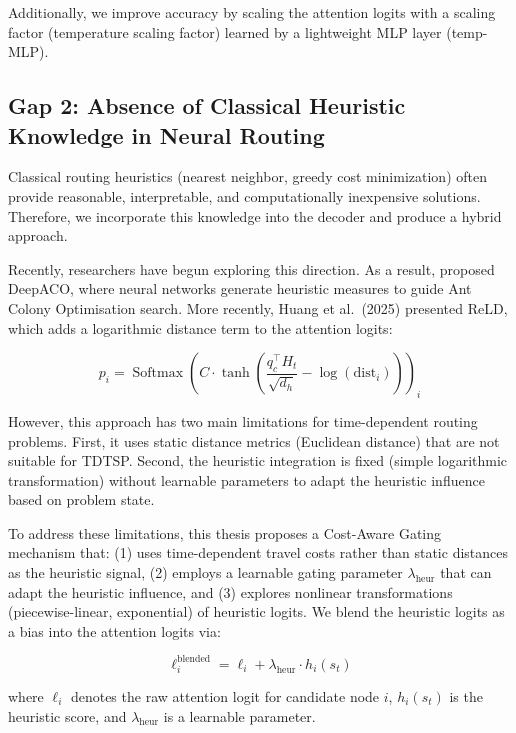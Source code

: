 Additionally, we improve accuracy by scaling the attention logits with a
scaling factor (temperature scaling factor) learned by a lightweight MLP layer
(temp-MLP).

\subsection{Gap 2: Absence of Classical Heuristic Knowledge in Neural Routing}

Classical routing heuristics (nearest neighbor, greedy cost minimization) often provide
reasonable, interpretable, and computationally inexpensive solutions. Therefore, we
incorporate this knowledge into the decoder and produce a hybrid approach.

Recently, researchers have begun exploring this direction. As a result, \citet{ye2023}
proposed DeepACO, where neural networks generate heuristic measures to guide Ant Colony
Optimisation search. More recently, Huang et al.\ (2025) presented ReLD, which adds a
logarithmic distance term to the attention logits:

\begin{equation}
    p_i = \operatorname{Softmax}\!\left(C \cdot \tanh\!\left(
        \frac{q_c^\top H_t}{\sqrt{d_h}} - \log(\mathrm{dist}_i)
    \right)\right)_{\!i}
    \label{eq:reld}
\end{equation}

However, this approach has two main limitations for time-dependent routing problems.
First, it uses static distance metrics (Euclidean distance) that are not suitable for
TDTSP. Second, the heuristic integration is fixed (simple logarithmic transformation)
without learnable parameters to adapt the heuristic influence based on problem state.

To address these limitations, this thesis proposes a Cost-Aware Gating mechanism that:
(1) uses time-dependent travel costs rather than static distances as the heuristic
signal, (2) employs a learnable gating parameter $\lambda_{\text{heur}}$ that can adapt
the heuristic influence, and (3) explores nonlinear transformations (piecewise-linear,
exponential) of heuristic logits. We blend the heuristic logits as a bias into the
attention logits via:

\begin{equation}
    \ell_i^{\text{blended}} = \ell_i + \lambda_{\text{heur}} \cdot h_i(s_t)
    \label{eq:blended_logit}
\end{equation}

where $\ell_i$ denotes the raw attention logit for candidate node $i$, $h_i(s_t)$ is
the heuristic score, and $\lambda_{\text{heur}}$ is a learnable parameter.

